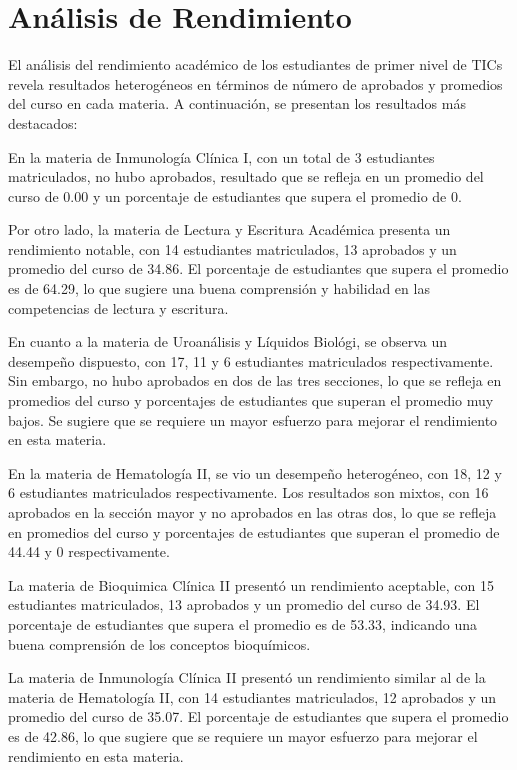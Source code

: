\vspace{1cm}
\section{Análisis de Rendimiento}
El análisis del rendimiento académico de los estudiantes de primer nivel de TICs revela resultados heterogéneos en términos de número de aprobados y promedios del curso en cada materia. A continuación, se presentan los resultados más destacados:

En la materia de Inmunología Clínica I, con un total de 3 estudiantes matriculados, no hubo aprobados, resultado que se refleja en un promedio del curso de 0.00 y un porcentaje de estudiantes que supera el promedio de 0.

Por otro lado, la materia de Lectura y Escritura Académica presenta un rendimiento notable, con 14 estudiantes matriculados, 13 aprobados y un promedio del curso de 34.86. El porcentaje de estudiantes que supera el promedio es de 64.29, lo que sugiere una buena comprensión y habilidad en las competencias de lectura y escritura.

En cuanto a la materia de Uroanálisis y Líquidos Biológi, se observa un desempeño dispuesto, con 17, 11 y 6 estudiantes matriculados respectivamente. Sin embargo, no hubo aprobados en dos de las tres secciones, lo que se refleja en promedios del curso y porcentajes de estudiantes que superan el promedio muy bajos. Se sugiere que se requiere un mayor esfuerzo para mejorar el rendimiento en esta materia.

En la materia de Hematología II, se vio un desempeño heterogéneo, con 18, 12 y 6 estudiantes matriculados respectivamente. Los resultados son mixtos, con 16 aprobados en la sección mayor y no aprobados en las otras dos, lo que se refleja en promedios del curso y porcentajes de estudiantes que superan el promedio de 44.44 y 0 respectivamente.

La materia de Bioquimica Clínica II presentó un rendimiento aceptable, con 15 estudiantes matriculados, 13 aprobados y un promedio del curso de 34.93. El porcentaje de estudiantes que supera el promedio es de 53.33, indicando una buena comprensión de los conceptos bioquímicos.

La materia de Inmunología Clínica II presentó un rendimiento similar al de la materia de Hematología II, con 14 estudiantes matriculados, 12 aprobados y un promedio del curso de 35.07. El porcentaje de estudiantes que supera el promedio es de 42.86, lo que sugiere que se requiere un mayor esfuerzo para mejorar el rendimiento en esta materia.

